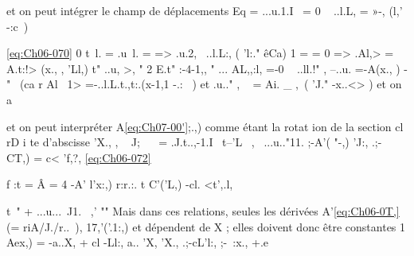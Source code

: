 et on peut intégrer le champ de déplacements 
Eq = ...u.1.I~ = 0 ~ ..l.L, = »-, (l,' -:c~) 

\eqref{eq:Ch06-070} 0
t~l. = .u~l. = => .u.2,~ ..l.L:, ( 'l:." êCa)
1
{ 
= = 0 => .Al,> = A.t:!> (x., , 'Ll,)
t" ..u, >, " 
2 E.t" :-4-1,, " ... AL,,:l, =-0 ~ ..ll.!" , --..u. =-A(x., )
-"~ (ca r Al ~}1> =-..l.L.t.,t:.(x-1,1 -.: ~) et .u.." , ~ = Ai. _ ,~( 'J." -x..<> ) et on a 

et on peut interpréter A\eqref{eq:Ch07-00'};.,) comme étant la rotat ion de la section cl rD i te 
d'abscisse 
'X., 
, 
~
J; ~~ = .J.t..,-1.I~ t--'L~ ,~ ...u.."11. ;-A'( "-,) 'J:, .;-\) CT,) = c< 'f,?,
\eqref{eq:Ch06-072} 


f :t = Â 	= 4 -A' l'x:,) r:r.:. t C'('L,) -cl. <t',.l,

t~" + ...u...~J1.
~,' 
"" 
Mais dans ces relations, seules les dérivées A'\eqref{eq:Ch06-0T,}(= riA/J./r..~), 17,'('.1:,) et dépendent de X ; elles doivent donc être constantes 
1 
Aex,) = -a..X, + cl 
-Ll:, a.. 'X, 'X., .;-cL'l:, ;-~:x., +.e

